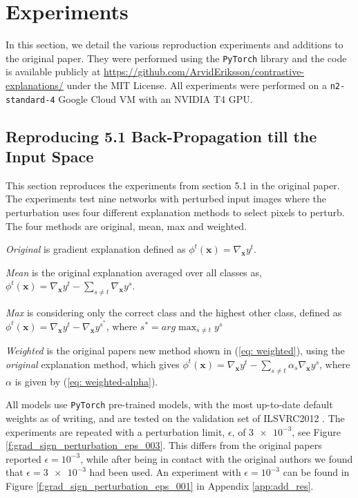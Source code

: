 \section{Experiments} %
\label{experiments}

In this section, we detail the various reproduction experiments and additions to the original paper. They were performed using the \texttt{PyTorch} library and the code is available publicly at \href{https://github.com/ArvidEriksson/contrastive-explanations/}{https://github.com/ArvidEriksson/contrastive-explanations/} under the MIT License. All experiments were performed on a \texttt{n2-standard-4} Google Cloud VM with an NVIDIA T4 GPU.



\subsection{Reproducing 5.1 Back-Propagation till the Input Space}
\label{backpropinput}
This section reproduces the experiments from section 5.1 in the original paper. The experiments test nine networks with perturbed input images where the perturbation uses four different explanation methods to select pixels to perturb. The four methods are original, mean, max and weighted.

\textit{Original} is gradient explanation defined as $\phi^t(\mathbf{x}) = \nabla_\textbf{x}y^t$.

\textit{Mean} is the original explanation averaged over all classes as, $\phi^t(\mathbf{x}) = \nabla_\textbf{x}y^t - \sum_{s \neq t} \nabla_\textbf{x}y^s $.

\textit{Max} is considering only the correct class and the highest other class, defined as $\phi^t(\mathbf{x}) = \nabla_\textbf{x}y^t - \nabla_\textbf{x}y^{s^*}$, where $s^* = arg \max_{s \neq t}y^s$

\textit{Weighted} is the original papers new method shown in (\ref{eq: weighted}), using the \textit{original} explanation method, which gives $\phi^t(\mathbf{x}) = \nabla_\textbf{x}y^t - \sum_{s \neq t} \alpha_s \nabla_\textbf{x}y^s$, where $\alpha$ is given by (\ref{eq: weighted-alpha}).

All models use \texttt{PyTorch} pre-trained models, with the most up-to-date default weights as of writing, and are tested on the validation set of ILSVRC2012 \citep{ILSVRC2012}. The experiments are repeated with a perturbation limit, $\epsilon$, of $\num{3e-3}$, see Figure \ref{f:grad_sign_perturbation_eps_003}. This differs from the original papers reported $\epsilon=10^{-3}$, while after being in contact with the original authors we found that $\epsilon=\num{3e-3}$ had been used. An experiment with $\epsilon=10^{-3}$ can be found in Figure \ref{f:grad_sign_perturbation_eps_001} in Appendix \ref{app:add_res}.

